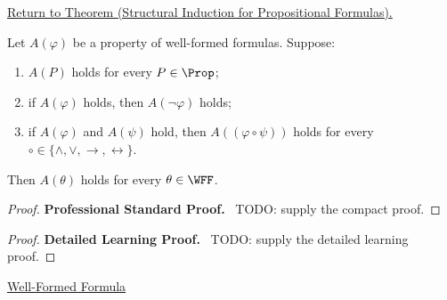 \newpage
{}
\label{prf:structural-induction-propositional-formulas}

\begin{remark*}[Return]
\hyperref[thm:structural-induction-propositional-formulas]{Return to Theorem (Structural Induction for Propositional Formulas).}
\end{remark*}

\begin{theorem*}
Let \(A(\varphi)\) be a property of well-formed formulas. Suppose:
\begin{enumerate}
\item \(A(P)\) holds for every \(P\in\Prop\);
\item if \(A(\varphi)\) holds, then \(A(\neg\varphi)\) holds;
\item if \(A(\varphi)\) and \(A(\psi)\) hold, then \(A((\varphi\circ\psi))\) holds for every \(\circ\in\{\land,\lor,\to,\leftrightarrow\}\).
\end{enumerate}
Then \(A(\theta)\) holds for every \(\theta\in\WFF\).
\end{theorem*}

\begin{proof}
\textbf{Professional Standard Proof.}~
TODO: supply the compact proof.
\end{proof}

\begin{proof}
\textbf{Detailed Learning Proof.}~
TODO: supply the detailed learning proof.
\end{proof}

\begin{remark*}
\end{remark*}

\begin{dependencies}
\hyperref[def:well-formed-formula]{Well-Formed Formula}
\end{dependencies}

\clearpage
